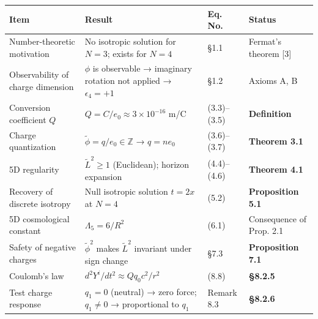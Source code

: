\documentclass[a4paper,11pt]{article}
\theoremstyle{definition}
\begin{document}
{\def\LTcaptype{none} %
\begin{longtable}[]{@{}
  >{\raggedright\arraybackslash}p{}
  >{\raggedright\arraybackslash}p{}
  >{\raggedright\arraybackslash}p{}
  >{\raggedright\arraybackslash}p{}@{}}
\toprule\noalign{}
\begin{minipage}[b]{\linewidth}\raggedright
Item
\end{minipage} & \begin{minipage}[b]{\linewidth}\raggedright
Result
\end{minipage} & \begin{minipage}[b]{\linewidth}\raggedright
Eq. No.
\end{minipage} & \begin{minipage}[b]{\linewidth}\raggedright
Status
\end{minipage} \\
\midrule\noalign{}
\endhead
\bottomrule\noalign{}
\endlastfoot
Number-theoretic motivation & No isotropic solution for \(N = 3\); exists for \(N = 4\) & §1.1 & Fermat's theorem {[}3{]} \\
Observability of charge dimension & \(\phi\) is observable → imaginary rotation not applied → \(\epsilon_4 = +1\) & §1.2 & Axioms A, B \\
Conversion coefficient \(Q\) & \(Q = C/e_0 \approx 3 \times 10^{-16}\) m/C & (3.3)--(3.5) & \textbf{Definition} \\
Charge quantization & \(\tilde{\phi} = q/e_0 \in \mathbb{Z}\) → \(q = ne_0\) & (3.6)--(3.7) & \textbf{Theorem 3.1} \\
5D regularity & \(\tilde{L}^2 \geq 1\) (Euclidean); horizon expansion & (4.4)--(4.6) & \textbf{Theorem 4.1} \\
Recovery of discrete isotropy & Null isotropic solution \(t = 2x\) at \(N = 4\) & (5.2) & \textbf{Proposition 5.1} \\
5D cosmological constant & \(\Lambda_5 = 6/R^2\) & (6.1) & Consequence of Prop. 2.1 \\
Safety of negative charges & \(\tilde{\phi}^2\) makes \(\tilde{L}^2\) invariant under sign change & §7.3 & \textbf{Proposition 7.1} \\
Coulomb's law & \(d^2Y^i/dt^2 \approx Qq_0 c^2/r^2\) & (8.8) & \textbf{§8.2.5} \\
Test charge response & \(q_1 = 0\) (neutral) → zero force; \(q_1 \neq 0\) → proportional to \(q_1\) & Remark 8.3 & \textbf{§8.2.6} \\

\end{longtable}}
\end{document}
